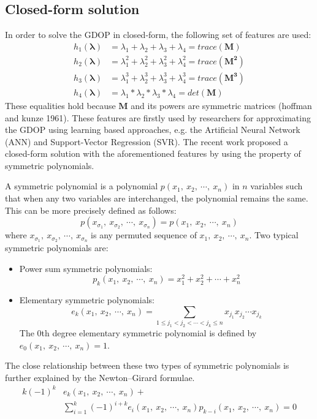 \documentclass[a4paper]{report}
\begin{document}
\subsection{Closed-form solution}
In order to solve the GDOP in closed-form, the following set of features are used:
\begin{align}
h_1(\mathbf{\lambda})&=\lambda_1+\lambda_2+\lambda_3+\lambda_4=trace(\mathbf{M}) \\
h_2(\mathbf{\lambda})&=\lambda_1^2+\lambda_2^2+\lambda_3^2+\lambda_4^2=trace(\mathbf{M^2}) \\
h_3(\mathbf{\lambda})&=\lambda_1^3+\lambda_2^3+\lambda_3^3+\lambda_4^3=trace(\mathbf{M^3}) \\
h_4(\mathbf{\lambda})&=\lambda_1*\lambda_2*\lambda_3*\lambda_4=det(\mathbf{M})
\end{align}
These equalities hold because $\mathbf{M}$ and its powers are symmetric matrices (hoffman and kunze 1961). These features are firstly used by researchers for approximating the GDOP using learning based approaches, e.g. the Artificial Neural Network (ANN) and Support-Vector Regression (SVR). The recent work proposed a closed-form solution with the aforementioned features by using the property of symmetric polynomials.

A symmetric polynomial is a polynomial $p(x_1,\ x_2,\ \cdots,\ x_n)$
in $n$ variables such that when any two variables are interchanged,
the polynomial remains the same. This can be
more precisely defined as follows:
\begin{equation}
p(x_{\sigma_1},\ x_{\sigma_2},\ \cdots,\ x_{\sigma_n})=p(x_1,\ x_2,\ \cdots,\ x_n)
\end{equation}
where $x_{\sigma_1},\ x_{\sigma_2},\ \cdots,\ x_{\sigma_n}$ is any permuted sequence of $x_1,\ x_2,\ \cdots,\ x_n$. Two typical symmetric polynomials are:
\begin{itemize}
	\item Power sum symmetric polynomials: 
	\begin{equation}
		p_k(x_1,\ x_2,\ \cdots,\ x_n)=x_1^2+x_2^2+\cdots+x_n^2
	\end{equation}
	\item Elementary symmetric polynomials:
	\begin{equation}
		e_k(x_1,\ x_2,\ \cdots,\ x_n)=\underset{1 \leq j_1<j_2<\cdots<j_k\leq n}{\sum}{x_{j_1}x_{j_2}\cdots x_{j_k}}
	\end{equation}
	The 0th degree elementary symmetric polynomial is defined by $e_0(x_1,\ x_2,\ \cdots,\ x_n) = 1$.
\end{itemize}
The close relationship between these two types of symmetric polynomials is further
explained by the Newton–Girard formulae.
\begin{align}
k(-1)^{k}&e_k(x_1,\ x_2,\ \cdots,\ x_n)+ \nonumber \\
&\sum_{i=1}^{k}{(-1)^{i+k}e_i(x_1,\ x_2,\ \cdots,\ x_n)p_{k-i}(x_1,\ x_2,\ \cdots,\ x_n)} = 0
\end{align}
\end{document}

